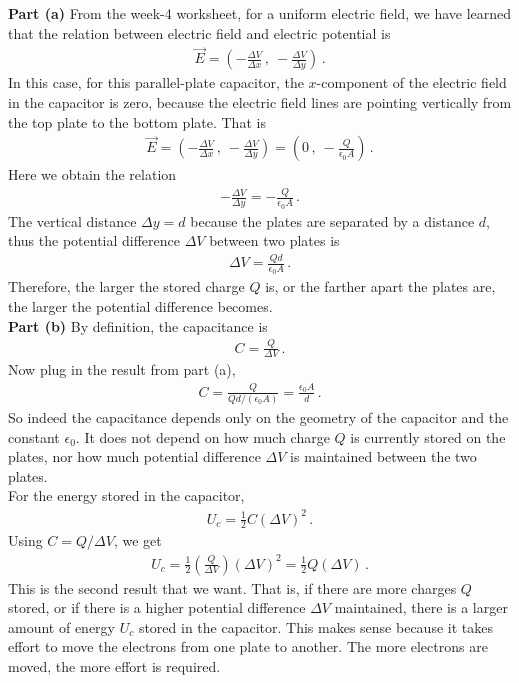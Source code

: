 \documentclass[11pt]{article}
\begin{document}
\noindent\textbf{Part (a)} From the week-4 worksheet, for a uniform electric field, we have learned that the relation between electric field and electric potential is
\begin{align*}
\vec{E} = \left( -\frac{\Delta V}{\Delta x}\,,\ -\frac{\Delta V}{\Delta y}\right)\,.
\end{align*}
In this case, for this parallel-plate capacitor, the $x$-component of the electric field in the capacitor is zero, because the electric field lines are pointing vertically from the top plate to the bottom plate. That is
\begin{align*}
\vec{E} = \left( -\frac{\Delta V}{\Delta x}\,,\ -\frac{\Delta V}{\Delta y}\right) = \left(0\,,\ -\frac{Q}{\epsilon_0 A}\right)\,.
\end{align*}
Here we obtain the relation
\begin{align*}
-\frac{\Delta V}{\Delta y} = -\frac{Q}{\epsilon_0 A}\,.
\end{align*}
The vertical distance $\Delta y = d$ because the plates are separated by a distance $d$, thus the potential difference $\Delta V$ between two plates is
\begin{align*}
\Delta V  = \frac{Qd}{\epsilon_0 A}\,.
\end{align*}
Therefore, the larger the stored charge $Q$ is, or the farther apart the plates are, the larger the potential difference becomes.\\

\noindent\textbf{Part (b)} By definition, the capacitance is
\begin{align*}
C = \frac{Q}{\Delta V}\,.
\end{align*}
Now plug in the result from part (a),
\begin{align*}
C = \frac{Q}{Qd/(\epsilon_0 A)} = \frac{\epsilon_0 A}{d}\,.
\end{align*}
So indeed the capacitance depends only on the geometry of the capacitor and the constant $\epsilon_0$. It does not depend on how much charge $Q$ is currently stored on the plates, nor how much potential difference $\Delta V$ is maintained between the two plates.\\

For the energy stored in the capacitor,
\begin{align*}
U_c = \frac{1}{2}C(\Delta V)^2\,.
\end{align*}
Using $C = Q/\Delta V$, we get
\begin{align*}
U_c = \frac{1}{2}\left(\frac{Q}{\Delta V}\right)(\Delta V)^2 = \frac{1}{2}Q(\Delta V)\,.
\end{align*}
This is the second result that we want. That is, if there are more charges $Q$ stored, or if there is a higher potential difference $\Delta V$ maintained, there is a larger amount of energy $U_c$ stored in the capacitor. This makes sense because it takes effort to move the electrons from one plate to another. The more electrons are moved, the more effort is required.\\
\end{document}

